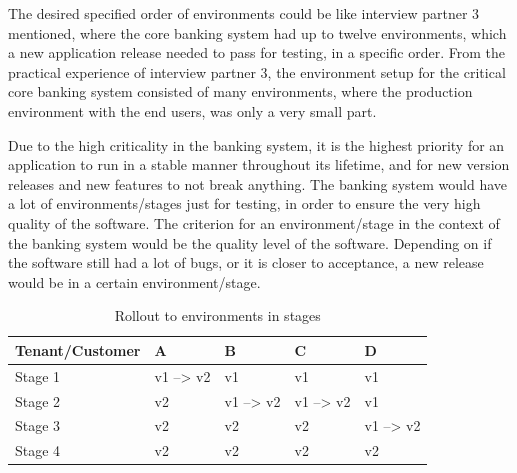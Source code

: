 The desired specified order of environments could be like interview partner 3 mentioned,
where the core banking system had up to twelve environments,
which a new application release needed to pass for testing,
in a specific order.
From the practical experience of interview partner 3,
the environment setup for the critical core banking system
consisted of many environments, where the production environment with the end users,
was only a very small part.


Due to the high criticality in the banking system,
it is the highest priority for an application to run in a stable manner throughout its lifetime,
and for new version releases and new features to not break anything.
The banking system would have a lot of environments/stages just for testing, in order to ensure the
very high quality of the software.
The criterion for an environment/stage in the context of the banking system
would be the quality level of the software.
Depending on if the software still had a lot of bugs, or it is closer to acceptance,
a new release would be in a certain environment/stage.


\begin{table}[h]
	\begin{center}
		\begin{tabular}{ |p{2.8cm}||p{1.5cm}|p{1.5cm}|p{1.5cm}|p{1.5cm}|  }
			\hline
			Tenant/Customer & A & B & C & D\\
			\hline
			Stage 1   & v1 --> v2    &v1&   v1 & v1\\
			Stage 2 &   v2  & v1 --> v2   & v1 --> v2 & v1\\
			Stage 3 &v2 & v2&  v2 & v1 --> v2 \\
			Stage 4 &v2 & v2&  v2 & v2\\
			\hline
		\end{tabular}
		\caption{Rollout to environments in stages}
		\label{table:rollout-envs-stages}
	\end{center}
\end{table}


